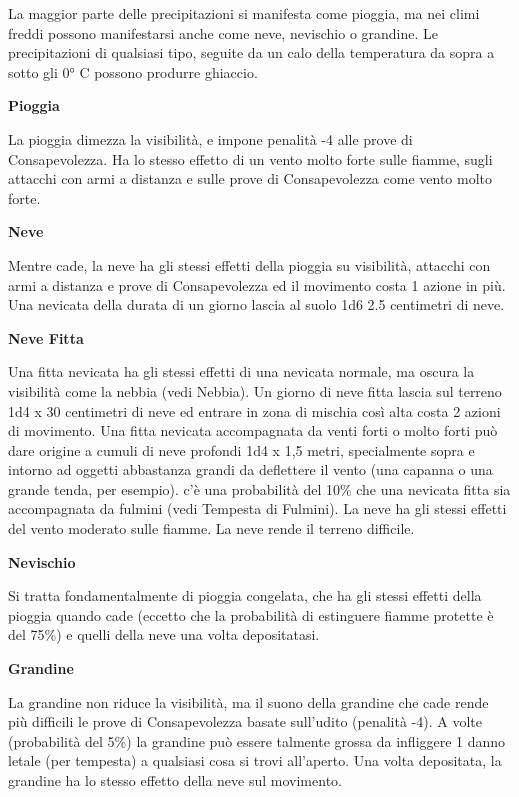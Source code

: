 \documentclass[a4paper,11pt,twoside,openany]{book}
\begin{document}
La maggior parte delle precipitazioni si manifesta come pioggia, ma nei climi freddi possono manifestarsi anche come neve, nevischio o grandine. Le precipitazioni di qualsiasi tipo, seguite da un calo della temperatura da sopra a sotto gli 0° C possono produrre ghiaccio.

\textbf{Pioggia}

La pioggia dimezza la visibilità, e impone penalità -4 alle prove di Consapevolezza. Ha lo stesso effetto di un vento molto forte sulle fiamme, sugli attacchi con armi a distanza e sulle prove di Consapevolezza come vento molto forte.

\textbf{Neve}

Mentre cade, la neve ha gli stessi effetti della pioggia su visibilità, attacchi con armi a distanza e prove di Consapevolezza ed il movimento costa 1 azione in più. Una nevicata della durata di un giorno lascia al suolo 1d6 \texttimes{} 2.5 centimetri di neve.

\textbf{Neve Fitta}

Una fitta nevicata ha gli stessi effetti di una nevicata normale, ma oscura la visibilità come la nebbia (vedi Nebbia). Un giorno di neve fitta lascia sul terreno 1d4 x 30 centimetri di neve ed entrare in zona di mischia così alta costa 2 azioni di movimento. Una fitta nevicata accompagnata da venti forti o molto forti può dare origine a cumuli di neve profondi 1d4 x 1,5 metri, specialmente sopra e intorno ad oggetti abbastanza grandi da deflettere il vento (una capanna o una grande tenda, per esempio).
c'è una probabilità del 10\% che una nevicata fitta sia accompagnata da fulmini (vedi Tempesta di Fulmini). La neve ha gli stessi effetti del vento moderato sulle fiamme. La neve rende il terreno difficile.

\textbf{Nevischio}

Si tratta fondamentalmente di pioggia congelata, che ha gli stessi effetti della pioggia quando cade (eccetto che la probabilità di estinguere fiamme protette è del 75\%) e quelli della neve una volta depositatasi.

\textbf{Grandine}

La grandine non riduce la visibilità, ma il suono della grandine che cade rende più difficili le prove di Consapevolezza basate sull'udito (penalità -4). A volte (probabilità del 5\%) la grandine può essere talmente grossa da infliggere 1 danno letale (per tempesta) a qualsiasi cosa si trovi all'aperto. Una volta depositata, la grandine ha lo stesso effetto della neve sul movimento.
\end{document}
